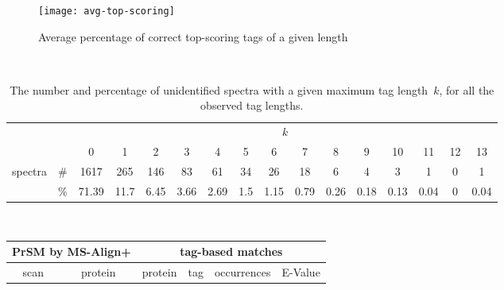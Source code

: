 \documentclass{article}[12pt]
\begin{document}
\begin{figure}
  \begin{center}
\texttt{[image: avg-top-scoring]}
\end{center}
\caption{Average percentage of correct top-scoring tags  of a given length}
  \label{fig:avg-top-scoring}
\end{figure}





\begin{landscape}

\begin{table}[h]
\vspace{3mm}\
{\centering
\begin{center}
\begin{tabular}{|c|c|
c|c|c|c|c|c|c|c|c|c|c|c|c|c|}
  \hline
  \multicolumn{2}{|c|}{} & \multicolumn{ 14}{|c|}{$k$} \\
  \cline{3-16}
  \multicolumn{2}{|c|}{} 
 & 0 & 1 & 2 & 3 & 4 & 5 & 6 & 7 & 8 & 9 & 10 & 11 & 12 & 13\\
  \hline
  \multirow{2}{*}{spectra} & \#
 & 1617 & 265 & 146 & 83 & 61 & 34 & 26 & 18 & 6 & 4 & 3 & 1 & 0 & 1\\
   & \%
 & 71.39 & 11.7 & 6.45 & 3.66 & 2.69 & 1.5 & 1.15 & 0.79 & 0.26 & 0.18 & 0.13 & 0.04 & 0 & 0.04\\
  \hline
\end{tabular}
\end{center}
\par}
\centering
\caption{The number and percentage of unidentified spectra with a given maximum tag length~$k$, for all the observed tag lengths.}
\vspace{3mm}
\label{table:unident-tags}
\end{table}


\begin{table}[h]\footnotesize
\vspace{3mm}\
{\centering
\begin{center}
\begin{tabular}{|c|c||c|c|c|c|}
  \hline
  \multicolumn{2}{|c||}{PrSM by MS-Align+} & \multicolumn{4}{|c|}{tag-based matches} \\
  \hline
  scan & protein & protein & tag & occurrences & E-Value\\


\end{tabular}
\end{center}}
\end{table}
\end{landscape}
\end{document}
